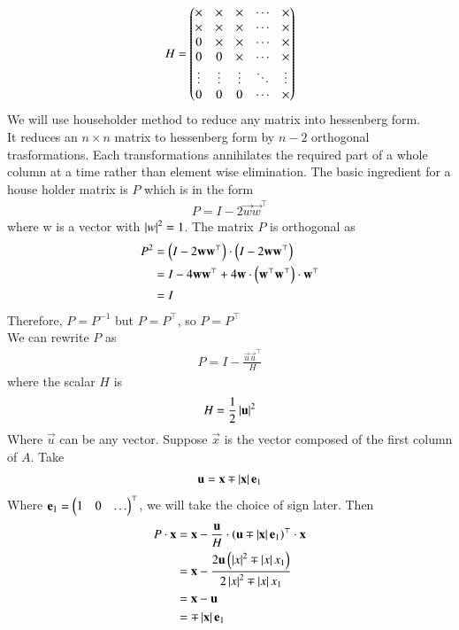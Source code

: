\documentclass[journal]{IEEEtran}
\begin{document}
\begin{align}
H = 
\begin{pmatrix}
\times & \times & \times & \cdots & \times \\
\times & \times & \times & \cdots & \times \\
0      & \times & \times & \cdots & \times \\
0      & 0      & \times & \cdots & \times \\
\vdots & \vdots & \vdots & \ddots & \vdots \\
0      & 0      & 0      & \cdots & \times
\end{pmatrix}
\end{align}
We will use householder method to reduce any matrix into hessenberg form.\\
It reduces an $n\times n$ matrix to hessenberg form by $n-2$ orthogonal trasformations. Each transformations annihilates the required part of a whole column at a time rather than element wise elimination. The basic ingredient for a house holder matrix is $P$ which is in the form
\begin{align}
	P = I-2\vec{w}\vec{w}^\top
\end{align}
where w is a vector with $\left\vert w\right\vert^2=1$. The matrix $P$ is orthogonal as
\begin{align}
P^2 &=\left(I - 2\mathbf{w}\mathbf{w}^\top\right)\cdot\left(I - 2\mathbf{w}\mathbf{w}^\top\right)\\
    &=I-4\mathbf{w}\mathbf{w}^\top + 4\mathbf{w}\cdot\left(\mathbf{w}^\top\mathbf{w}^\top\right)\cdot\mathbf{w}^\top\\
    &=I
\end{align}
Therefore, $P=P^{-1}$ but $P = P^\top$, so $P = P^\top$ \\
We can rewrite $P$ as
\begin{align}
	P = I - \frac{\vec{u}\vec{u}^\top}{H}
\end{align}
where the scalar $H$ is
\begin{align}
H = \frac{1}{2}\left\vert\mathbf{u}\right\vert^2
\end{align}
Where $\vec{u}$ can be any vector. Suppose $\vec{x}$ is the vector composed of the first column of $A$. Take
\begin{align}
	\mathbf{u} = \mathbf{x} \mp \left\vert\mathbf{x}\right\vert\mathbf{e}_1
\end{align}
Where $\mathbf{e}_1 = \begin{pmatrix}1 & 0 & \dots\end{pmatrix}^\top$, we will take the choice of sign later. Then
\begin{align}
	P\cdot\mathbf{x} &= \mathbf{x} - \frac{\mathbf{u}}{H}\cdot\left(\mathbf{u}\mp \left\vert\mathbf{x}\right\vert\mathbf{e}_1\right)^\top\cdot \mathbf{x}\\
	              &= \mathbf{x} - \frac{2\mathbf{u}\left(\left\vert x\right\vert^2\mp \left\vert x\right\vert x_1\right)}{2\left\vert x\right\vert^2\mp \left\vert x\right\vert x_1}\\
	              &= \mathbf{x} - \mathbf{u}\\
	              &= \mp\left\vert\mathbf{x}\right\vert\mathbf{e}_1
\end{align}
\end{document}
